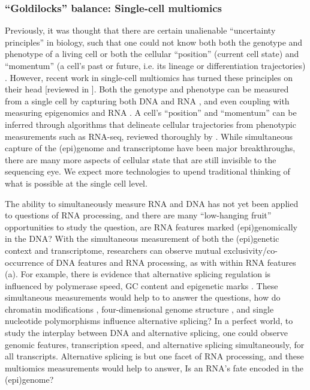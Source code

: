 \subsubsection{``Goldilocks'' balance: Single-cell multiomics}

Previously, it was thought that there are certain unalienable ``uncertainty principles'' in biology, such that one could not know both both the genotype and phenotype of a living cell \cite{Strippoli2005-ko} or both the cellular ``position'' (current cell state) and ``momentum'' (a cell's past or future, i.e. its lineage or differentiation trajectories) \cite{Shapiro2013-kk}. However, recent work in single-cell multiomics has turned these principles on their head [reviewed in \citet{Macaulay2017-tb}]. Both the genotype and phenotype can be measured from a single cell by capturing both DNA and RNA \cite{Macaulay2015-iz,Reuter2016-op}, and even coupling with measuring epigenomics and RNA \cite{Angermueller2016-rx,Hou2016-zi}. A cell's ``position'' and ``momentum'' can be inferred through algorithms that delineate cellular trajectories from phenotypic measurements such as RNA-seq, reviewed thoroughly by \citet{Cannoodt2016-mt}. While simultaneous capture of the (epi)genome and transcriptome have been major breakthroughs, there are many more aspects of cellular state that are still invisible to the sequencing eye. We expect more technologies to upend traditional thinking of what is possible at the single cell level.

The ability to simultaneously measure RNA and DNA has not yet been applied to questions of RNA processing, and there are many ``low-hanging fruit'' opportunities to study the question, are RNA features marked (epi)genomically in the DNA? With the simultaneous measurement of both the (epi)genetic context and transcriptome, researchers can observe mutual exclusivity/co\hyp{}occurrence of DNA features and RNA processing, as with within RNA features (a). For example, there is evidence that alternative splicing regulation is influenced by polymerase speed, GC content and epigenetic marks \cite{Fiszbein2017-vl,Kornblihtt2013-gm,Tilgner2010-ia}. These simultaneous measurements would help to to answer the questions, how do chromatin modifications \cite{Calo2013-xx,Ng1999-tp}, four\hyp{}dimensional genome structure \cite{Dekker2017-yg}, and single nucleotide polymorphisms influence alternative splicing? In a perfect world, to study the interplay between DNA and alternative splicing, one could observe genomic features, transcription speed, and alternative splicing simultaneously, for all transcripts. Alternative splicing is but one facet of RNA processing, and these multiomics measurements would help to answer, Is an RNA's fate encoded in the (epi)genome?

